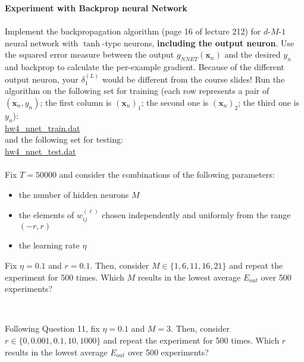 \documentclass[a4paper,10pt]{exam}
\begin{document}
\begin{questions}
	   \question \textbf{Experiment with Backprop neural Network }\\
	   \\Implement the backpropagation algorithm (page 16 of lecture 212) for $d$-$M$-$1$ neural network with $\tanh$-type neurons, \textbf{including the output neuron}. Use the squared error measure between the output $g_{NNET}(\mathbf{x}_n)$ and the desired $y_n$ and backprop to calculate the per-example gradient. Because of the different output neuron, your $\delta_1^{(L)}$ would be different from the course slides! Run the algorithm on the following set for training (each row represents a pair of $(\mathbf{x}_n, y_n)$; the first column is $(\mathbf{x}_n)_1$; the second one is $(\mathbf{x}_n)_2$; the third one is $y_n$):\\
	   \href{https://d396qusza40orc.cloudfront.net/ntumltwo/hw4_data/hw4_nnet_train.dat}{hw4\_nnet\_train.dat}\\
	   and the following set for testing:\\
	   \href{https://d396qusza40orc.cloudfront.net/ntumltwo/hw4_data/hw4_nnet_test.dat}{hw4\_nnet\_test.dat}\\
	   \\Fix $T=50000$ and consider the combinations of the following parameters:
	   \begin{itemize}
	   	\item the number of hidden neurons $M$
	   	\item the elements of $w_{ij}^{(\ell)}$ chosen independently and uniformly from the range $(-r, r)$
	   	\item the learning rate $\eta$
	   \end{itemize}
	   Fix $\eta = 0.1$ and $r = 0.1$. Then, consider $M \in \{1, 6, 11, 16, 21\}$ and repeat the experiment for 500 times. Which $M$ results in the lowest average $E_{out}$ over 500 experiments?
	   \begin{choices}
	   	 \\
	   \end{choices}
	   
	   \question Following Question 11, fix $\eta = 0.1$ and $M=3$. Then, consider $r \in \{0, 0.001, 0.1, 10, 1000\}$ and repeat the experiment for 500 times. Which $r$ results in the lowest average $E_{out}$ over 500 experiments?
	   \begin{choices}
	   	\choice 0
	   	\CorrectChoice 0.1
	   	\choice 0.001
	   	\choice 10
	   	\\
	   \end{choices}
	   

\end{questions}
\end{document}
